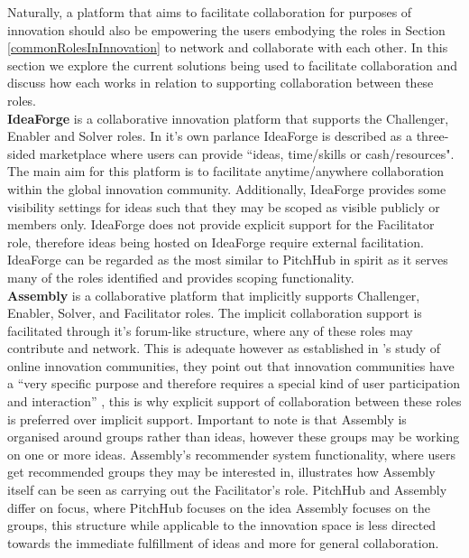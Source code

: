 Naturally, a platform that aims to facilitate collaboration for purposes of innovation should also be empowering the users embodying the roles in Section \ref{commonRolesInInnovation} to network and collaborate with each other. In this section we explore the current solutions being used to facilitate collaboration and discuss how each works in relation to supporting collaboration between these roles.
\\
\newline
\textbf{IdeaForge} \cite{ideaForge:online}
is a collaborative innovation platform that supports the Challenger, Enabler and Solver roles. In it's own parlance IdeaForge is described as a three-sided marketplace where users can provide ``ideas, time/skills or cash/resources". The main aim for this platform is to facilitate anytime/anywhere collaboration within the global innovation community. Additionally, IdeaForge provides some visibility settings for ideas such that they may be scoped as visible publicly or members only. IdeaForge does not provide explicit support for the Facilitator role, therefore ideas being hosted on IdeaForge require external facilitation. IdeaForge can be regarded as the most similar to PitchHub in spirit as it serves many of the roles identified and provides scoping functionality.
\\
\newline
\textbf{Assembly} \cite{assembly:online}
is a collaborative platform that implicitly supports Challenger, Enabler, Solver, and Facilitator roles. The implicit collaboration support is facilitated through it's forum-like structure, where any of these roles may contribute and network. This is adequate however as established in \citeauthor{hautz2010establish}'s study of online innovation communities, they point out that innovation communities have a ``very specific purpose and therefore requires a special kind of user participation and interaction'' \cite{hautz2010establish}, this is why explicit support of collaboration between these roles is preferred over implicit support. Important to note is that Assembly is organised around groups rather than ideas, however these groups may be working on one or more ideas. Assembly's recommender system functionality, where users get recommended groups they may be interested in, illustrates how Assembly itself can be seen as carrying out the Facilitator's role. PitchHub and Assembly differ on focus, where PitchHub focuses on the idea Assembly focuses on the groups, this structure while applicable to the innovation space is less directed towards the immediate fulfillment of ideas and more for general collaboration.
